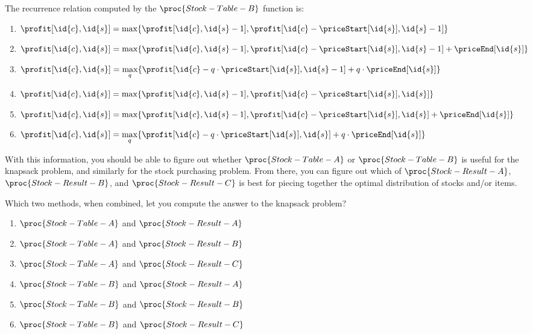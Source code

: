 \documentclass[12pt,twoside]{article}
\newcommand{\answerIIo}{\solution{
2
}}
\begin{document}
\begin{problems}
\begin{problemparts}
\problempart
{}
The recurrence relation computed
by the $\proc{Stock-Table-B}$ function
is:
\begin{enumerate}
\item $\profit[\id{c}, \id{s}] = \displaystyle\max\{ \profit[\id{c}, \id{s}- 1], \profit[\id{c} - \priceStart[\id{s}], \id{s} - 1] \}$
\item $\profit[\id{c}, \id{s}] = \displaystyle\max\{ \profit[\id{c}, \id{s}- 1], \profit[\id{c} - \priceStart[\id{s}], \id{s} - 1] + \priceEnd[\id{s}]\}$
\item $\profit[\id{c}, \id{s}] = \displaystyle\max_q \{ \profit[\id{c} - q \cdot \priceStart[\id{s}], \id{s} - 1 ]+ q \cdot \priceEnd[\id{s}] \}$
\item $\profit[\id{c}, \id{s}] = \displaystyle\max\{ \profit[\id{c}, \id{s}- 1], \profit[\id{c} - \priceStart[\id{s}], \id{s} ] \}$
\item $\profit[\id{c}, \id{s}] = \displaystyle\max\{ \profit[\id{c}, \id{s}- 1], \profit[\id{c} - \priceStart[\id{s}], \id{s} ]+ \priceEnd[\id{s}] \}$
\item $\profit[\id{c}, \id{s}] = \displaystyle\max_q\{ \profit[\id{c} - q \cdot \priceStart[\id{s}], \id{s} ]+ q \cdot \priceEnd[\id{s}] \}$
\end{enumerate}

\answerIIo

\end{problemparts}

With this information,
you should be able to figure out
whether
$\proc{Stock-Table-A}$
or
$\proc{Stock-Table-B}$
is useful for the knapsack problem,
and similarly for the stock purchasing problem.
From there,
you can figure out which of
$\proc{Stock-Result-A}$,
$\proc{Stock-Result-B}$, and
$\proc{Stock-Result-C}$
is best for piecing together
the optimal distribution of stocks and/or items.

\begin{problemparts}
\problempart
{}
Which two methods, when combined,
let you compute the answer to the knapsack problem?
\begin{enumerate}
\item $\proc{Stock-Table-A}$ and $\proc{Stock-Result-A}$
\item $\proc{Stock-Table-A}$ and $\proc{Stock-Result-B}$
\item $\proc{Stock-Table-A}$ and $\proc{Stock-Result-C}$
\item $\proc{Stock-Table-B}$ and $\proc{Stock-Result-A}$
\item $\proc{Stock-Table-B}$ and $\proc{Stock-Result-B}$
\item $\proc{Stock-Table-B}$ and $\proc{Stock-Result-C}$
\end{enumerate}


\end{problemparts}
\end{problems}
\end{document}
